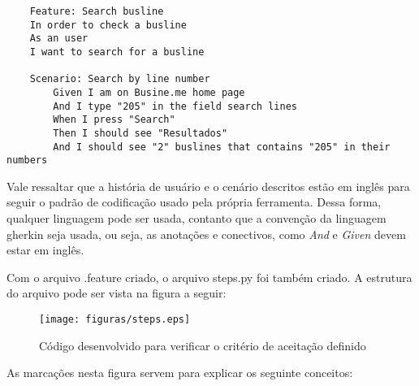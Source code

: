     \begin{verbatim}
    Feature: Search busline
    In order to check a busline
    As an user
    I want to search for a busline

    Scenario: Search by line number
        Given I am on Busine.me home page
        And I type "205" in the field search lines
        When I press "Search"
        Then I should see "Resultados"
        And I should see "2" buslines that contains "205" in their numbers
   \end{verbatim}

   Vale ressaltar que a história de usuário e o cenário descritos estão em
   inglês para seguir o padrão de codificação usado pela própria ferramenta.
   Dessa forma, qualquer linguagem pode ser usada, contanto que a convenção da
   linguagem gherkin seja usada, ou seja, as anotações e conectivos, como
   \textit{And} e \textit{Given} devem estar em inglês.

   Com o arquivo .feature criado, o arquivo steps.py foi também criado. A
   estrutura do arquivo pode ser vista na figura a seguir:

    \begin{figure}[h!]
        \centering
        \texttt{[image: figuras/steps.eps]}
        \caption{Código desenvolvido para verificar o critério de aceitação
        definido}
    \end{figure}

    As marcações nesta figura servem para explicar os seguinte conceitos:

